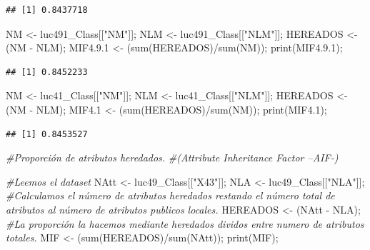 \documentclass[
]{article}
\newenvironment{Shaded}{\begin{snugshade}}{\end{snugshade}}
\newcommand{\CommentTok}[1]{\textcolor[rgb]{0.56,0.35,0.01}{\textit{#1}}}
\newcommand{\FloatTok}[1]{\textcolor[rgb]{0.00,0.00,0.81}{#1}}
\newcommand{\FunctionTok}[1]{\textcolor[rgb]{0.00,0.00,0.00}{#1}}
\newcommand{\NormalTok}[1]{#1}
\newcommand{\OtherTok}[1]{\textcolor[rgb]{0.56,0.35,0.01}{#1}}
\newcommand{\SpecialCharTok}[1]{\textcolor[rgb]{0.00,0.00,0.00}{#1}}
\newcommand{\StringTok}[1]{\textcolor[rgb]{0.31,0.60,0.02}{#1}}
\begin{document}
\begin{verbatim}
## [1] 0.8437718
\end{verbatim}

\begin{Shaded}
\begin{Highlighting}[]
\NormalTok{NM }\OtherTok{\textless{}{-}}\NormalTok{ luc491\_Class[[}\StringTok{"NM"}\NormalTok{]];}
\NormalTok{NLM }\OtherTok{\textless{}{-}}\NormalTok{ luc491\_Class[[}\StringTok{"NLM"}\NormalTok{]];}
\NormalTok{HEREADOS }\OtherTok{\textless{}{-}}\NormalTok{ (NM }\SpecialCharTok{{-}}\NormalTok{ NLM);}
\NormalTok{MIF4.}\FloatTok{9.1} \OtherTok{\textless{}{-}}\NormalTok{ (}\FunctionTok{sum}\NormalTok{(HEREADOS)}\SpecialCharTok{/}\FunctionTok{sum}\NormalTok{(NM));}
\FunctionTok{print}\NormalTok{(MIF4.}\FloatTok{9.1}\NormalTok{);}
\end{Highlighting}
\end{Shaded}

\begin{verbatim}
## [1] 0.8452233
\end{verbatim}

\begin{Shaded}
\begin{Highlighting}[]
\NormalTok{NM }\OtherTok{\textless{}{-}}\NormalTok{ luc41\_Class[[}\StringTok{"NM"}\NormalTok{]];}
\NormalTok{NLM }\OtherTok{\textless{}{-}}\NormalTok{ luc41\_Class[[}\StringTok{"NLM"}\NormalTok{]];}
\NormalTok{HEREADOS }\OtherTok{\textless{}{-}}\NormalTok{ (NM }\SpecialCharTok{{-}}\NormalTok{ NLM);}
\NormalTok{MIF4}\FloatTok{.1} \OtherTok{\textless{}{-}}\NormalTok{ (}\FunctionTok{sum}\NormalTok{(HEREADOS)}\SpecialCharTok{/}\FunctionTok{sum}\NormalTok{(NM));}
\FunctionTok{print}\NormalTok{(MIF4}\FloatTok{.1}\NormalTok{);}
\end{Highlighting}
\end{Shaded}

\begin{verbatim}
## [1] 0.8453527
\end{verbatim}

\begin{Shaded}
\begin{Highlighting}[]
\CommentTok{\#Proporción de atributos heredados.}
\CommentTok{\#(Attribute Inheritance Factor –AIF{-})}

\CommentTok{\#Leemos el dataset  }
\NormalTok{NAtt }\OtherTok{\textless{}{-}}\NormalTok{ luc49\_Class[[}\StringTok{"X43"}\NormalTok{]];}
\NormalTok{NLA }\OtherTok{\textless{}{-}}\NormalTok{ luc49\_Class[[}\StringTok{"NLA"}\NormalTok{]];}
\CommentTok{\#Calculamos el número de atributos heredados restando el número total de atributos al número de atributos publicos locales.}
\NormalTok{HEREADOS }\OtherTok{\textless{}{-}}\NormalTok{ (NAtt }\SpecialCharTok{{-}}\NormalTok{ NLA);}
\CommentTok{\#La proporción la hacemos mediante heredados dividos entre numero de atributos totales.}
\NormalTok{MIF }\OtherTok{\textless{}{-}}\NormalTok{ (}\FunctionTok{sum}\NormalTok{(HEREADOS)}\SpecialCharTok{/}\FunctionTok{sum}\NormalTok{(NAtt));}
\FunctionTok{print}\NormalTok{(MIF);}
\end{Highlighting}
\end{Shaded}
\end{document}
